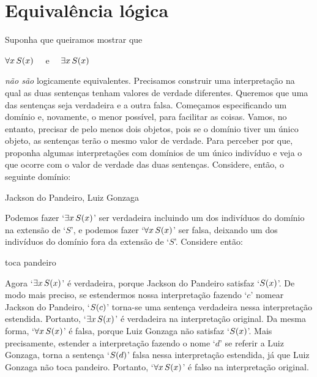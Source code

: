\section{Equivalência lógica}
Suponha que queiramos mostrar que
\begin{center}
	$\forall x\, \mathord{S}(x)$ \ \ e \ \ $\exists x\, \mathord{S}(x)$
\end{center}
\emph{não são} logicamente equivalentes.
Precisamos construir uma interpretação na qual as duas sentenças tenham valores de verdade diferentes.
Queremos que uma das sentenças seja verdadeira e a outra falsa.
Começamos especificando um domínio e, novamente, o menor possível, para facilitar as coisas.
Vamos, no entanto, precisar de pelo menos dois objetos, pois se o domínio tiver um único objeto, as sentenças terão o mesmo valor de verdade. 
Para perceber por que, proponha algumas interpretações com domínios de um único indivíduo e veja o que ocorre com o valor de verdade das duas sentenças.
Considere, então, o seguinte domínio:
	\begin{center}
	\begin{ekey}
		\item[\text{domínio}] Jackson do Pandeiro, Luiz Gonzaga
	\end{ekey}
	\end{center}
Podemos fazer `$\exists x\, \mathord{S}(x)$' ser verdadeira incluindo um dos indivíduos do domínio na extensão de `$S$', e podemos fazer `$\forall x\, \mathord{S}(x)$' ser falsa, deixando um dos indivíduos do domínio fora da extensão de `$S$'.
Considere então:
	\begin{center}
	\begin{ekey}
		\item[\atom{S}{x}]  toca pandeiro
	\end{ekey}
	\end{center}
Agora `$\exists x\, \mathord{S}(x)$' é verdadeira, porque Jackson do Pandeiro satisfaz `$\mathord{S}(x)$'.
De modo mais preciso, se estendermos nossa interpretação fazendo `$c$' nomear Jackson do Pandeiro, `$\mathord{S}(c)$' torna-se uma sentença verdadeira nessa interpretação estendida.
Portanto, `$\exists x\, \mathord{S}(x)$' é verdadeira na interpretação original.
Da mesma forma, `$\forall x\, \mathord{S}(x)$' é falsa, porque Luiz Gonzaga não satisfaz `$\mathord{S}(x)$'.
Mais precisamente, estender a interpretação fazendo o nome `$d$' se referir a Luiz Gonzaga, torna a sentença `$\mathord{S}(d)$' falsa nessa interpretação estendida, já que Luiz Gonzaga não toca pandeiro.
Portanto, `$\forall x\, \mathord{S}(x)$' é falso na interpretação original.
